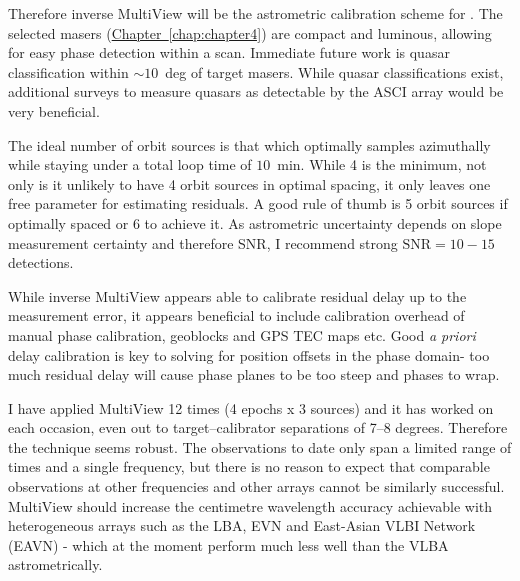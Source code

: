 	Therefore inverse MultiView will be the astrometric calibration scheme for \spirals. The selected masers (\hyperref[chap:chapter4]{Chapter~\ref*{chap:chapter4}}) are compact and luminous, allowing for easy phase detection within a scan. Immediate future work is quasar classification within $\sim10$~deg of target masers. While quasar classifications exist, additional surveys to measure quasars as detectable by the ASCI array would be very beneficial. 
	
	The ideal number of orbit sources is that which optimally samples azimuthally while staying under a total loop time of $10$~min. While 4 is the minimum, not only is it unlikely to have 4 orbit sources in optimal spacing, it only leaves one free parameter for estimating residuals. A good rule of thumb is 5 orbit sources if optimally spaced or 6 to achieve it. As astrometric uncertainty depends on slope measurement certainty and therefore SNR, I recommend strong $\text{SNR}=10-15$ detections.
	
	While inverse MultiView appears able to calibrate residual delay up to the measurement error, it appears beneficial to include calibration overhead of manual phase calibration, geoblocks and GPS TEC maps etc. Good \textit{a priori} delay calibration is key to solving for position offsets in the phase domain- too much residual delay will cause phase planes to be too steep and phases to wrap.%
	
    I have applied MultiView 12 times (4 epochs x 3 sources) and it has worked on each occasion, even out to target--calibrator separations of 7--8 degrees. Therefore the technique seems robust. The observations to date only span a limited range of times and a single frequency, but there is no reason to expect that comparable observations at other frequencies and other arrays cannot be similarly successful.  MultiView should increase the centimetre wavelength accuracy achievable with heterogeneous arrays such as the LBA, EVN and East-Asian VLBI Network (EAVN) - which at the moment perform much less well than the VLBA astrometrically.
	
	
	
	
	
	


	
	